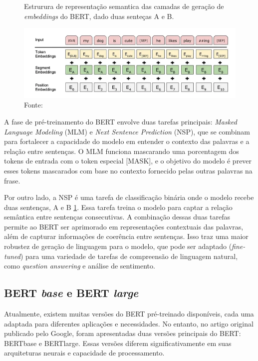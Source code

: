 \begin{figure}[H]
    \centering
    \caption{Estrurura de representação semantica das camadas de geração de \textit{embeddings} do BERT, dado duas senteças A e B.}
    \includegraphics[width=\linewidth]{img/BERT/bert3.png}
    \caption*{Fonte: \cite{DBLP:journals/corr/abs-1810-04805}}
    \label{fig:bert3}
\end{figure}


A fase de pré-treinamento do BERT envolve duas tarefas principais: \textit{Masked Language Modeling} (MLM) e \textit{Next Sentence Prediction} (NSP), que se combinam para fortalecer a capacidade do modelo em entender o contexto das palavras e a relação entre sentenças. O MLM funciona mascarando uma porcentagem dos tokens de entrada com o token especial [MASK], e o objetivo do modelo é prever esses tokens mascarados com base no contexto fornecido pelas outras palavras na frase. 

Por outro lado, a NSP é uma tarefa de classificação binária onde o modelo recebe duas sentenças, A e B  \ref{fig:bert3}. Essa tarefa treina o modelo para captar a relação semântica entre sentenças consecutivas. A combinação dessas duas tarefas permite ao BERT ser aprimorado em representações contextuais das palavras, além de capturar informações de coerência entre sentenças. Isso traz uma maior robustez de geração de linguagem para o modelo, que pode ser adaptado (\textit{fine-tuned}) para uma variedade de tarefas de compreensão de linguagem natural, como \textit{question answering} e análise de sentimento.

\subsection{BERT \textit{base} e BERT \textit{large}}
Atualmente, existem muitas versões do BERT pré-treinado disponíveis, cada uma adaptada para diferentes aplicações e necessidades. No entanto, no artigo original publicado pelo Google, foram apresentadas duas versões principais do BERT: BERTbase e BERTlarge. Essas versões diferem significativamente em suas arquiteturas neurais e capacidade de processamento.

